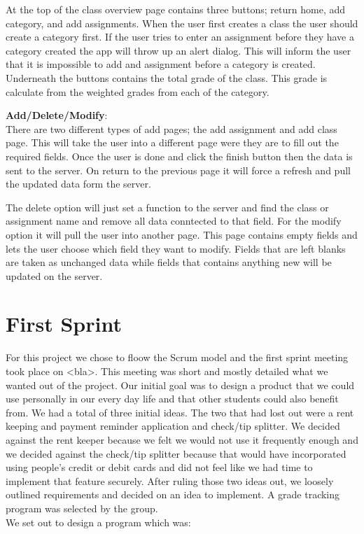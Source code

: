 \documentclass[a4paper]{article} %
\begin{document}
At the top of the class overview page contains three buttons; return home, add category, and add assignments. When the user first creates a class the user should create a category first. If the user tries to enter an assignment before they have a category created the app will throw up an alert dialog. This will inform the user that it is impossible to add and assignment before a category is created. Underneath the buttons contains the total grade of the class. This grade is calculate from the weighted grades from each of the category.


\textbf{Add/Delete/Modify}:\\
There are two different types of add pages; the add assignment and add class page. This will take the user into a different page were they are to fill out the required fields. Once the user is done and click the finish button then the data is sent to the server. On return to the previous page it will force a refresh and pull the updated data form the server.

The delete option will just set a function to the server and find the class or assignment name and remove all data conntected to that field. For the modify option it will pull the user into another page. This page contains empty fields and lets the user choose which field they want to modify. Fields that are left blanks are taken as unchanged data while fields that contains anything new will be updated on the server.


\section{First Sprint}

For this project we chose to floow the Scrum model and the first sprint meeting took place on <bla>. This meeting was short and mostly detailed what we wanted out of the project. Our initial goal was to design a product that we could use personally in our every day life and that other students could also benefit from. We had a total of three initial ideas. The two that had lost out were a rent keeping and payment reminder application and check/tip splitter. We decided against the rent keeper because we felt we would not use it frequently enough and we decided against the check/tip splitter because that would have incorporated using people's credit or debit cards and did not feel like we had time to implement that feature securely. After ruling those two ideas out, we loosely outlined requirements and decided on an idea to implement. A grade tracking program was selected by the group. 
\\
We set out to design a program which was:
\end{document}
